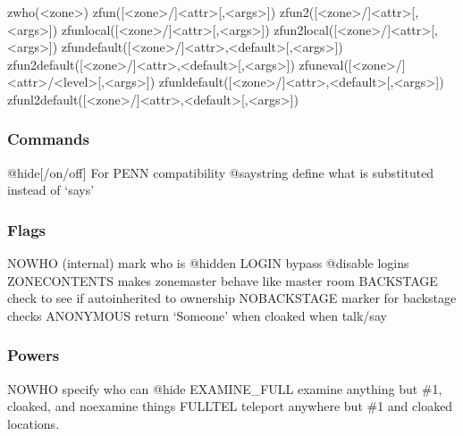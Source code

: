 \documentclass[letterpaper,10pt,english]{sphinxmanual}
\begin{document}
zwho(\textless{}zone\textgreater{})
zfun({[}\textless{}zone\textgreater{}/{]}\textless{}attr\textgreater{}{[},\textless{}args\textgreater{}{]})
zfun2({[}\textless{}zone\textgreater{}/{]}\textless{}attr\textgreater{}{[},\textless{}args\textgreater{}{]})
zfunlocal({[}\textless{}zone\textgreater{}/{]}\textless{}attr\textgreater{}{[},\textless{}args\textgreater{}{]})
zfun2local({[}\textless{}zone\textgreater{}/{]}\textless{}attr\textgreater{}{[},\textless{}args\textgreater{}{]})
zfundefault({[}\textless{}zone\textgreater{}/{]}\textless{}attr\textgreater{},\textless{}default\textgreater{}{[},\textless{}args\textgreater{}{]})
zfun2default({[}\textless{}zone\textgreater{}/{]}\textless{}attr\textgreater{},\textless{}default\textgreater{}{[},\textless{}args\textgreater{}{]})
zfuneval({[}\textless{}zone\textgreater{}/{]}\textless{}attr\textgreater{}/\textless{}level\textgreater{}{[},\textless{}args\textgreater{}{]})
zfunldefault({[}\textless{}zone\textgreater{}/{]}\textless{}attr\textgreater{},\textless{}default\textgreater{}{[},\textless{}args\textgreater{}{]})
zfunl2default({[}\textless{}zone\textgreater{}/{]}\textless{}attr\textgreater{},\textless{}default\textgreater{}{[},\textless{}args\textgreater{}{]})


\subsubsection{Commands}
\label{\detokenize{changelog:id86}}
\sphinxAtStartPar
@hide{[}/on/off{]} \sphinxhyphen{} For PENN compatibility
@saystring \sphinxhyphen{} define what is substituted instead of ‘says’


\subsubsection{Flags}
\label{\detokenize{changelog:id87}}
\sphinxAtStartPar
NOWHO (internal) \sphinxhyphen{} mark who is @hidden
LOGIN \sphinxhyphen{} bypass @disable logins
ZONECONTENTS \sphinxhyphen{} makes zonemaster behave like master room
BACKSTAGE \sphinxhyphen{} check to see if auto\sphinxhyphen{}inherited to ownership
NOBACKSTAGE \sphinxhyphen{} marker for backstage checks
ANONYMOUS \sphinxhyphen{} return ‘Someone’ when cloaked when talk/say


\subsubsection{Powers}
\label{\detokenize{changelog:powers}}
\sphinxAtStartPar
NOWHO \sphinxhyphen{} specify who can @hide
EXAMINE\_FULL \sphinxhyphen{} examine anything but \#1, cloaked, and noexamine things
FULLTEL \sphinxhyphen{} teleport anywhere but \#1 and cloaked locations.
\end{document}

